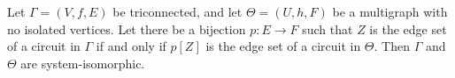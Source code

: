 Let $\Gamma = (V, f, E)$ be triconnected, and let $\Theta = (U, h, F)$ be a multigraph with no isolated vertices. Let there be a bijection $p: E \rightarrow F$ such that $Z$ is the edge set of a circuit in $\Gamma$ if and only if $p[Z]$ is the edge set of a circuit in $\Theta$. Then $\Gamma$ and $\Theta$ are system-isomorphic.
